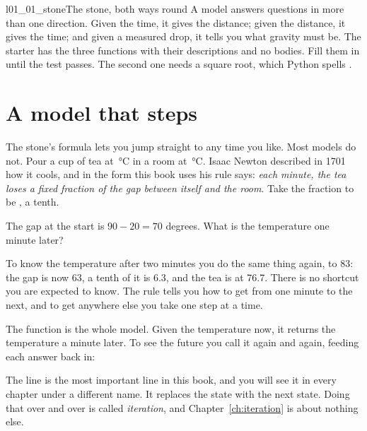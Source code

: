 \begin{lab}{l01_01_stone}{The stone, both ways round}
A model answers questions in more than one direction. Given the time, it
gives the distance; given the distance, it gives the time; and given a
measured drop, it tells you what gravity must be. The starter has the three
functions with their descriptions and no bodies. Fill them in until the test
passes. The second one needs a square root, which Python spells
.
\end{lab}

\section{A model that steps}
\label{sec:ch01-steps}

\noindent
The stone's formula lets you jump straight to any time you like. Most
models do not. Pour a cup of tea at \,°C in a room at
\,°C. Isaac Newton described in 1701 how it cools, and in
the form this book uses his rule says: \emph{each minute, the tea loses a
fixed fraction of the gap between itself and the room}. Take the fraction to
be , a tenth.

\begin{think}
The gap at the start is $90 - 20 = 70$ degrees. What is the temperature one
minute later?
\end{think}
To know the temperature after two minutes you do the same thing again, to
$83$: the gap is now $63$, a tenth of it is \num{6.3}, and the tea is at
\num{76.7}. There is no shortcut you are expected to know. The rule tells you
how to get from one minute to the next, and to get anywhere else you take one
step at a time.


\noindent
The function  is the whole model. Given the temperature
now, it returns the temperature a minute later. To see the future you call it
again and again, feeding each answer back in:



\noindent
The line  is the most important line in this
book, and you will see it in every chapter under a different name. It
replaces the state with the next state. Doing that over and over is called
\emph{iteration}, and Chapter~\ref{ch:iteration} is about nothing else.

